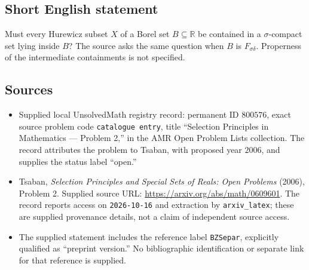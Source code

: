 \documentclass[11pt]{article}
\newcommand{\R}{\mathbb{R}}
\begin{document}
\subsection{Short English statement}
Must every Hurewicz subset \(X\) of a Borel set \(B\subseteq\R\) be contained in a \(\sigma\)-compact set lying inside \(B\)? The source asks the same question when \(B\) is \(F_{\sigma\delta}\). Properness of the intermediate containments is not specified.
\subsection{Sources}
\begin{itemize}
\item Supplied local UnsolvedMath registry record: permanent ID \(800576\), exact source problem code \texttt{catalogue entry}, title ``Selection Principles in Mathematics --- Problem 2,'' in the AMR Open Problem Lists collection. The record attributes the problem to Tsaban, with proposed year \(2006\), and supplies the status label ``open.''
\item Tsaban, \emph{Selection Principles and Special Sets of Reals: Open Problems} (2006), Problem 2. Supplied source URL: \url{https://arxiv.org/abs/math/0609601}. The record reports access on \texttt{2026-10-16} and extraction by \texttt{arxiv\_latex}; these are supplied provenance details, not a claim of independent source access.
\item The supplied statement includes the reference label \texttt{BZSepar}, explicitly qualified as ``preprint version.'' No bibliographic identification or separate link for that reference is supplied.
\end{itemize}
\end{document}
